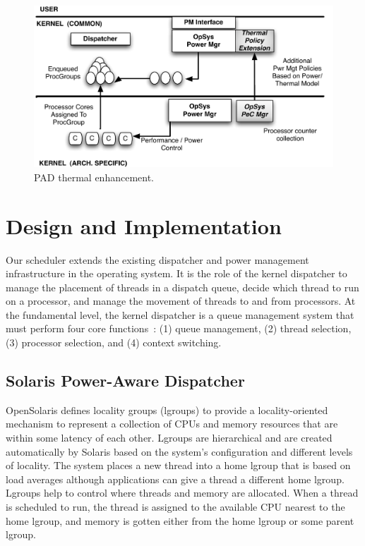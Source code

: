 \documentclass[acmtaco]{acmtrans2m}
\begin{document}
\begin{figure}[htbp]
  \centering
  \includegraphics[scale=0.40]{schedarch.pdf}
  \caption{PAD thermal enhancement.}
  \label{fig:schdarch}
\end{figure}
\section{Design and Implementation}
\label{sec:design}
Our scheduler extends the existing dispatcher and power
management infrastructure in the operating system. It is the role of the
kernel dispatcher to manage the placement of threads in a dispatch
queue, decide which thread to run on a processor, and manage the
movement of threads to and from processors.  At the fundamental level,
the kernel dispatcher is a queue management system that must perform
four core functions~\cite{McDougall2007}: (1) queue management, (2)
thread selection, (3) processor selection, and (4) context switching.
\subsection{Solaris Power-Aware Dispatcher}
\label{sec:solpad}
OpenSolaris defines locality groups (lgroups) to provide a
locality-oriented mechanism to represent a collection of CPUs and
memory resources that are within some latency of each other.
Lgroups are hierarchical and are created automatically by Solaris
based on the system’s conﬁguration and different levels of
locality. The system places a new thread into a home lgroup that
is based on load averages although applications can give a thread
a different home lgroup. Lgroups help to control where threads
and memory are allocated.  When a thread is scheduled to run, the
thread is assigned to the available CPU nearest to the home
lgroup, and memory is gotten either from the home lgroup or some
parent lgroup.
\end{document}
